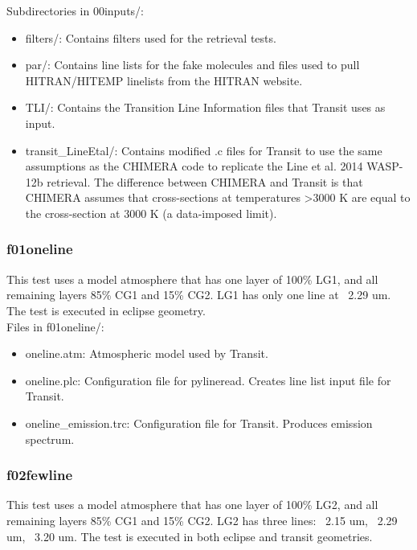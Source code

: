 \documentclass[letterpaper, 12pt]{article}
\begin{document}
Subdirectories in 00inputs/:
\begin{itemize} \itemsep0pt
  \item filters/: Contains filters used for the retrieval tests.
  \item par/: Contains line lists for the fake molecules and files used to pull 
        HITRAN/HITEMP linelists from the HITRAN website.
  \item TLI/: Contains the Transition Line Information files that Transit uses 
        as input.
  \item transit_LineEtal/: Contains modified .c files for Transit to use the 
        same assumptions as the CHIMERA code to replicate the Line et al. 2014 
        WASP-12b retrieval. The difference between CHIMERA and Transit is that 
        CHIMERA assumes that cross-sections at temperatures 
        {\textgreater}3000 K are equal to the cross-section at 
        3000 K (a data-imposed limit).
\end{itemize}

\subsubsection{f01oneline}
\label{sec:oneline}
This test uses a model atmosphere that has one layer of 100\% LG1, and all 
remaining layers 85\% CG1 and 15\% CG2. LG1 has only one line at ~2.29 um. 
The test is executed in eclipse geometry.\\

Files in f01oneline/:
\begin{itemize} \itemsep0pt
  \item oneline.atm: Atmospheric model used by Transit.
  \item oneline.plc: Configuration file for pylineread. Creates line 
        list input file for Transit.
  \item oneline{\_}emission.trc: Configuration file for Transit. Produces 
        emission spectrum.
\end{itemize}

\subsubsection{f02fewline}
\label{sec:fewline}
This test uses a model atmosphere that has one layer of 100\% LG2, and all 
remaining layers 85\% CG1 and 15\% CG2. LG2 has three lines: ~2.15 um, 
~2.29 um, ~3.20 um. The test is executed in both eclipse and transit 
geometries.\\
\end{document}
